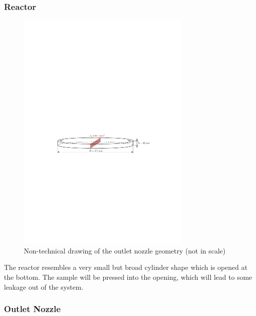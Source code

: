\subsubsection*{Reactor}

	\begin{figure}[H]
	    \centering
	    \includegraphics[width=0.75\textwidth]{src/03_analytical-work/fig_reactor-geometry.pdf}
	    \caption{Non-technical drawing of the outlet nozzle geometry (not in scale)}
	    \label{fig:geometry-reactor}
	\end{figure}
	The reactor resembles a very small but broad cylinder shape which is opened at the bottom.
	The sample will be pressed into the opening, which will lead to some leakage out of the system.
	
\subsubsection*{Outlet Nozzle}
	
